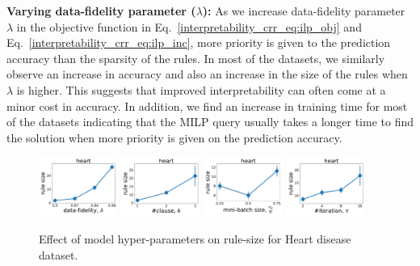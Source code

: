 	\textbf{Varying data-fidelity parameter ($ \lambda $):}  As we increase data-fidelity parameter $ \lambda $ in the objective function in Eq.~\ref{interpretability_crr_eq:ilp_obj} and Eq.~\ref{interpretability_crr_eq:ilp_inc}, more priority is given to the prediction accuracy than the sparsity of the rules.  In most of the datasets, we similarly observe an increase in accuracy  and also an increase in the size of the rules when $ \lambda $ is higher. This suggests that improved interpretability can often come at a  minor cost in accuracy.  
	In addition, we  find an increase in training time for most of the datasets indicating that the MILP query usually takes a longer time to find the solution when more priority is given on the prediction accuracy.  
	
	\begin{figure}[t]
		\centering
		\subfloat
		{\includegraphics[width=0.23\textwidth]{figures/interpretability/relaxed-cnf/heart_rule_size_vary_lambda.pdf}\label{interpretability_crr_fig:c}} \hfill
		\subfloat
		{\includegraphics[width=0.23\textwidth]{figures/interpretability/relaxed-cnf/heart_rule_size_vary_clause.pdf}\label{interpretability_crr_fig:h}} \hfill
		\subfloat
		{\includegraphics[width=0.23\textwidth]{figures/interpretability/relaxed-cnf/heart_rule_size_vary_subsamplesize.pdf}\label{interpretability_crr_fig:b}} \hfill 
		\subfloat
		{\includegraphics[width=0.23\textwidth]{figures/interpretability/relaxed-cnf/heart_rule_size_vary_iteration.pdf}\label{interpretability_crr_fig:e}} \hfill
		\caption{Effect of model hyper-parameters on rule-size for  Heart disease dataset.} 
		
		\vspace{-10pt}
		\label{interpretability_crr_fig:result_2}
	\end{figure}
	
